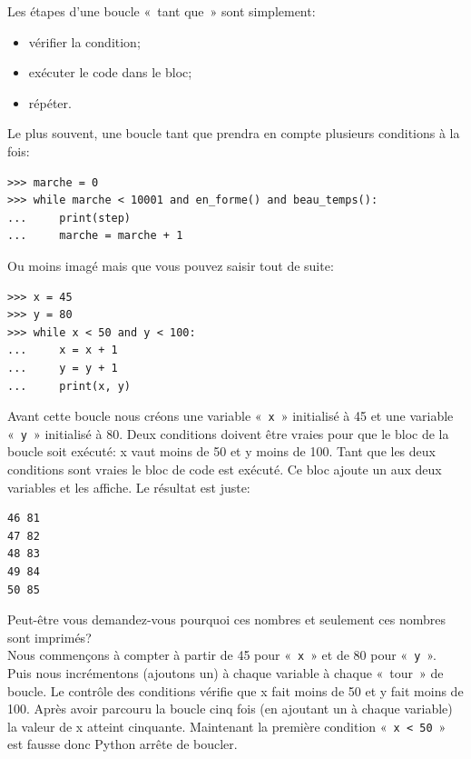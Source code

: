 Les étapes d'une boucle «~tant que~» sont simplement:
\begin{itemize}
\item vérifier la condition;
\item exécuter le code dans le bloc;
\item répéter.
\end{itemize}

Le plus souvent, une boucle tant que prendra en compte plusieurs conditions à la fois:

\begin{Verbatim}[frame=single,rulecolor=\color{gray}, label=ne pas saisir]
>>> marche = 0
>>> while marche < 10001 and en_forme() and beau_temps():
...     print(step)
...     marche = marche + 1 
\end{Verbatim}

Ou moins imagé mais que vous pouvez saisir tout de suite:

\begin{Verbatim}[frame=single,rulecolor=\color{mbleu}, label=à taper]
>>> x = 45
>>> y = 80
>>> while x < 50 and y < 100:
...     x = x + 1
...     y = y + 1
...     print(x, y)
\end{Verbatim}

Avant cette boucle nous créons une variable «~\texttt{x}~»  initialisé à 45 et une variable «~\texttt{y}~» initialisé à 80. Deux conditions doivent être vraies pour que le bloc de la boucle soit exécuté: x vaut moins de 50 et y moins de 100. Tant que les deux conditions sont vraies le bloc de code est exécuté. Ce bloc ajoute un aux deux variables et les affiche. Le résultat est juste:

\begin{Verbatim}[frame=single,rulecolor=\color{gray}, label=ne pas saisir]
46 81
47 82
48 83
49 84
50 85
\end{Verbatim}

Peut-être vous demandez-vous pourquoi ces nombres et seulement ces nombres sont imprimés?\\

Nous commençons à compter à partir de 45 pour «~\texttt{x}~»  et de 80 pour «~\texttt{y}~». Puis nous incrémentons (ajoutons un) à chaque variable à chaque «~tour~» de boucle. Le contrôle des conditions vérifie que x fait moins de 50 et y fait moins de 100. Après avoir parcouru la boucle cinq fois (en ajoutant un à chaque variable) la valeur de x atteint cinquante. Maintenant la première condition «~\texttt{x < 50}~»  est fausse donc Python arrête de boucler.

